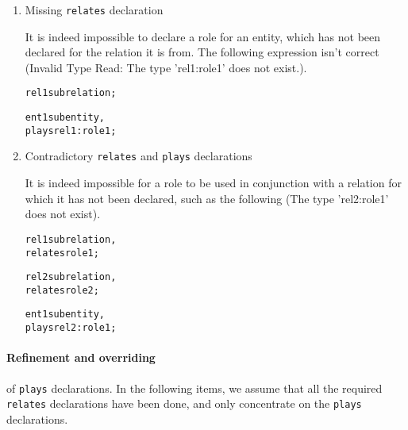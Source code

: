 \documentclass{article}
\begin{document}
\begin{enumerate}
\item Missing \texttt{relates} declaration

It is indeed impossible to declare a role for an entity, which has not been declared for the relation it is from. The following expression isn't correct (Invalid Type Read: The type 'rel1:role1' does not exist.).

  \begin{alltt}
rel1 sub relation;

ent1 sub entity,
  plays rel1:role1;
  \end{alltt}

\item Contradictory \texttt{relates} and \texttt{plays} declarations

It is indeed impossible for a role to be used in conjunction with a relation for which it has not been declared, such as the following (The type 'rel2:role1' does not exist).

  \begin{alltt}
rel1 sub relation,
  relates role1;

rel2 sub relation,
  relates role2;

ent1 sub entity,
  plays rel2:role1;
  \end{alltt}

\end{enumerate}


\paragraph{Refinement and overriding} of \texttt{plays} declarations. In the
following items, we assume that all the required \texttt{relates}
declarations have been done, and only concentrate on the \texttt{plays}
declarations.
\end{document}
